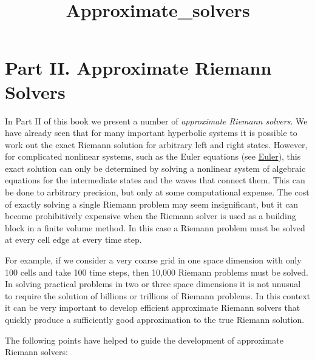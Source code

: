 \documentclass[11pt]{article}
\title{Approximate\_solvers}
\begin{document}
    
    \maketitle
    
    

    
    \hypertarget{part-ii.-approximate-riemann-solvers}{%
\section{Part II. Approximate Riemann
Solvers}\label{part-ii.-approximate-riemann-solvers}}

    In Part II of this book we present a number of \emph{approximate Riemann
solvers}. We have already seen that for many important hyperbolic
systems it is possible to work out the exact Riemann solution for
arbitrary left and right states. However, for complicated nonlinear
systems, such as the Euler equations (see \href{Euler.ipynb}{Euler}),
this exact solution can only be determined by solving a nonlinear system
of algebraic equations for the intermediate states and the waves that
connect them. This can be done to arbitrary precision, but only at some
computational expense. The cost of exactly solving a single Riemann
problem may seem insignificant, but it can become prohibitively
expensive when the Riemann solver is used as a building block in a
finite volume method. In this case a Riemann problem must be solved at
every cell edge at every time step.

For example, if we consider a very coarse grid in one space dimension
with only 100 cells and take 100 time steps, then 10,000 Riemann
problems must be solved. In solving practical problems in two or three
space dimensions it is not unusual to require the solution of billions
or trillions of Riemann problems. In this context it can be very
important to develop efficient approximate Riemann solvers that quickly
produce a sufficiently good approximation to the true Riemann solution.

    The following points have helped to guide the development of approximate
Riemann solvers:
\end{document}
